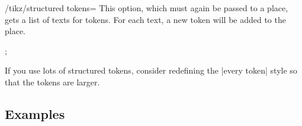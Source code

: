 \begin{key}{/tikz/structured tokens=}
    This option, which must again be passed to a place, gets a list of texts
    for tokens. For each text, a new token will be added to the place.
\begin{codeexample}[]
\tikz  \node[place,structured tokens={$x$,$y$,$z$}] {};
\end{codeexample}
\begin{codeexample}[]
\end{codeexample}
    If you use lots of structured tokens, consider redefining the |every token|
    style so that the tokens are larger.
\end{key}


\subsection{Examples}

